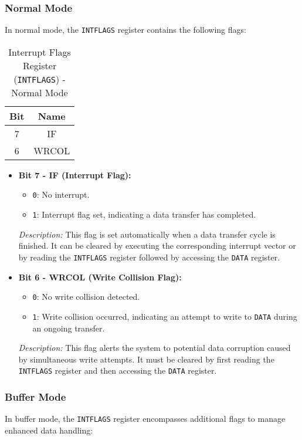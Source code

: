   \subsubsection{Normal Mode}
  In normal mode, the \texttt{INTFLAGS} register contains the following flags:
  
  \begin{table}[H]
      \centering
      \caption{Interrupt Flags Register (\texttt{INTFLAGS}) - Normal Mode}
      \begin{tabular}{@{}cc@{}}
          \toprule
          \textbf{Bit} & \textbf{Name} \\ \midrule
          7 & IF \\
          6 & WRCOL \\ \bottomrule
      \end{tabular}
      \label{tab:intflags_normal}
  \end{table}
  
  \begin{itemize}
      \item \textbf{Bit 7 - IF (Interrupt Flag):} 
      \begin{itemize}
          \item \texttt{0}: No interrupt.
          \item \texttt{1}: Interrupt flag set, indicating a data transfer has completed.
      \end{itemize}
      \textit{Description:} This flag is set automatically when a data transfer cycle is finished. It can be cleared by executing the corresponding interrupt vector or by reading the \texttt{INTFLAGS} register followed by accessing the \texttt{DATA} register.
      
      \item \textbf{Bit 6 - WRCOL (Write Collision Flag):} 
      \begin{itemize}
          \item \texttt{0}: No write collision detected.
          \item \texttt{1}: Write collision occurred, indicating an attempt to write to \texttt{DATA} during an ongoing transfer.
      \end{itemize}
      \textit{Description:} This flag alerts the system to potential data corruption caused by simultaneous write attempts. It must be cleared by first reading the \texttt{INTFLAGS} register and then accessing the \texttt{DATA} register.
  \end{itemize}
  
  \subsubsection{Buffer Mode}
  In buffer mode, the \texttt{INTFLAGS} register encompasses additional flags to manage enhanced data handling:
  
